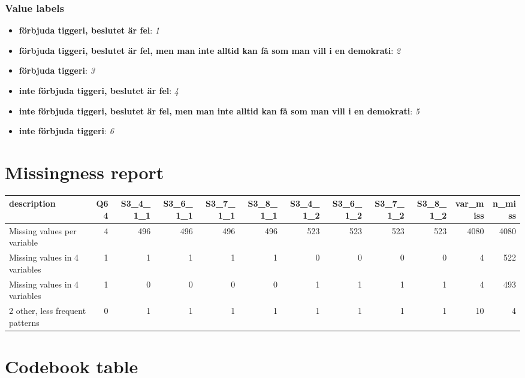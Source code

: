 \documentclass[
]{book}
\providecommand{\tightlist}{%
  \setlength{\itemsep}{0pt}\setlength{\parskip}{0pt}}
\begin{document}
\hypertarget{Studie3sel_labels}{%
\subsubsection{Value labels}\label{Studie3sel_labels}}

\begin{itemize}
\tightlist
\item
  \textbf{förbjuda tiggeri, beslutet är fel}: \emph{1}
\item
  \textbf{förbjuda tiggeri, beslutet är fel, men man inte alltid kan få som man vill i en demokrati}: \emph{2}
\item
  \textbf{förbjuda tiggeri}: \emph{3}
\item
  \textbf{inte förbjuda tiggeri, beslutet är fel}: \emph{4}
\item
  \textbf{inte förbjuda tiggeri, beslutet är fel, men man inte alltid kan få som man vill i en demokrati}: \emph{5}
\item
  \textbf{inte förbjuda tiggeri}: \emph{6}
\end{itemize}

\hypertarget{missingness-report}{%
\section{Missingness report}\label{missingness-report}}

\begin{tabular}{l|r|r|r|r|r|r|r|r|r|r|r}
\hline
description & Q64 & S3\_4\_1\_1 & S3\_6\_1\_1 & S3\_7\_1\_1 & S3\_8\_1\_1 & S3\_4\_1\_2 & S3\_6\_1\_2 & S3\_7\_1\_2 & S3\_8\_1\_2 & var\_miss & n\_miss\\
\hline
Missing values per variable & 4 & 496 & 496 & 496 & 496 & 523 & 523 & 523 & 523 & 4080 & 4080\\
\hline
Missing values in 4 variables & 1 & 1 & 1 & 1 & 1 & 0 & 0 & 0 & 0 & 4 & 522\\
\hline
Missing values in 4 variables & 1 & 0 & 0 & 0 & 0 & 1 & 1 & 1 & 1 & 4 & 493\\
\hline
2 other, less frequent patterns & 0 & 1 & 1 & 1 & 1 & 1 & 1 & 1 & 1 & 10 & 4\\
\hline
\end{tabular}

\hypertarget{codebook-table}{%
\section{Codebook table}\label{codebook-table}}
\end{document}
